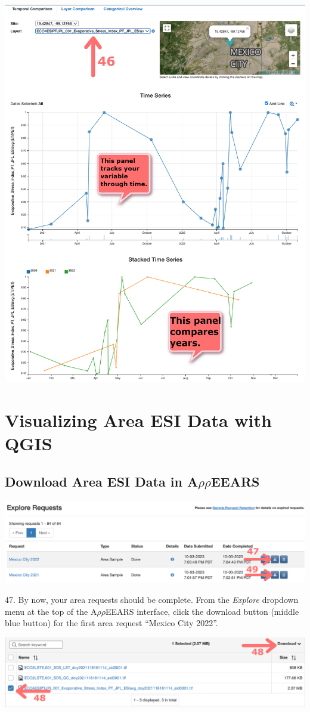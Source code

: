 \documentclass[oneside,a4paper,11pt,explicit]{book}
\begin{document}
\vspace{.5em}

\centerline{\includegraphics[width=.6\textwidth]{exploreESIpoint.png}}

\section{Visualizing Area ESI Data with QGIS}

\subsection{Download Area ESI Data in A$\rho\rho$EEARS}

\centerline{\includegraphics[width=.6\textwidth]{ESIareaRequestDown.png}}

\vspace{.5em}

47. By now, your area requests should be complete. From the \textit{Explore} dropdown menu at the top of the A$\rho\rho$EEARS interface, click the download button (middle blue button) for the first area request ``Mexico City 2022''. 

\vspace{.5em}

\centerline{\includegraphics[width=.6\textwidth]{ESIareaDownload.png}}
\end{document}
